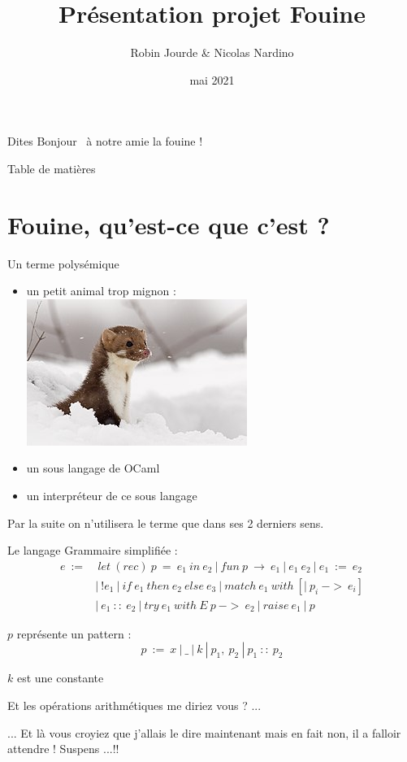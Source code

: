 \documentclass{beamer}
\title{Présentation projet Fouine}
\author{Robin Jourde \& Nicolas Nardino}
\date{mai 2021}
\newcommand{\tocpage}{
  \begin{frame}
    \tableofcontents[currentsection]
  \end{frame}
}
\begin{document}
\begin{frame}
  \titlepage
\end{frame}


\begin{frame}{Dites \og Bonjour \fg~à notre amie la fouine !}
  \begin{center}
    \tiny
    
  \end{center}
\end{frame}


\begin{frame}{Table de matières}
  \tableofcontents
\end{frame}


\section{Fouine, qu'est-ce que c'est ?}

\tocpage

\begin{frame}{Un terme polysémique}
  \begin{itemize}
  \item<2-> un petit animal trop mignon : \\
    \includegraphics[width=0.2\linewidth]{figures/photo_fouine.jpg}
  \item<3-> un sous langage de OCaml
  \item<4-> un interpréteur de ce sous langage
  \end{itemize}

   {Par la suite on n'utilisera le terme que dans ses 2 derniers sens.}
\end{frame}

\begin{frame}{Le langage}
  Grammaire simplifiée :
  \begin{align*}
    e~:=&~let~(rec)~p~=~e_1~in~e_2~|~fun~p~\to~e_1~|~e_1~e_2~|~e_1~:=~e_2 \\
        &|~!e_1~|~if~e_1~then~e_2~else~e_3~|~match~e_1~with~[|~p_i~->~e_i] \\
        &|~e_1~::~e_2~|~try~e_1~with~E~p~->~e_2~|~raise~e_1~|~p
  \end{align*}

  $p$ représente un pattern :
  $$
  p~:=~x~|~\_~|~k~|~p_1,~p_2~|~p_1~::~p_2
  $$

  $k$ est une constante

   {Et les opérations arithmétiques me diriez vous ? ... }

   {... Et là vous croyiez que j'allais le dire maintenant mais en fait non, il a falloir attendre ! Suspens ...!!  }
\end{frame}
\end{document}
